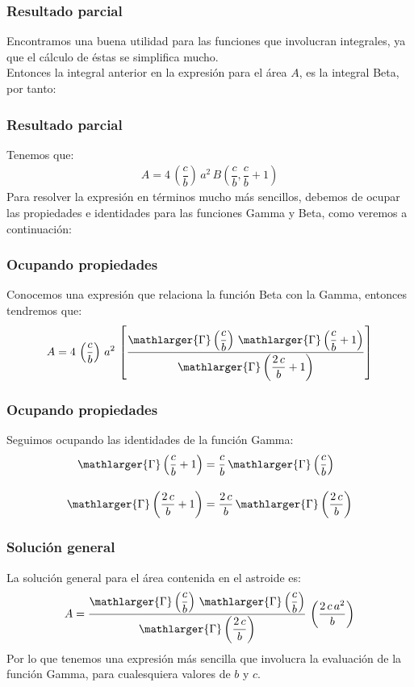 \documentclass[12pt]{beamer}
\begin{document}
\begin{frame}
\frametitle{Resultado parcial}
Encontramos una buena utilidad para las funciones que involucran integrales, ya que el cálculo de éstas se simplifica mucho.
\\
\bigskip
\pause
Entonces la integral anterior en la expresión para el área $A$, es la integral Beta, por tanto:
\end{frame}
\begin{frame}
\frametitle{Resultado parcial}
Tenemos que:
\pause
\begin{align*}
A = 4 \, \left( \dfrac{c}{b} \right) \, a^{2} \, B \left( \dfrac{c}{b}, \dfrac{c}{b} + 1 \right)
\end{align*}
\pause
Para resolver la expresión en términos mucho más sencillos, debemos de ocupar las propiedades e identidades para las funciones Gamma y Beta, como veremos a continuación:
\end{frame}
\begin{frame}
\frametitle{Ocupando propiedades}
Conocemos una expresión que relaciona la función Beta con la Gamma, entonces tendremos que:
\pause 
\begin{align*}
A = 4 \, \left( \dfrac{c}{b} \right) \, a^{2} \, \left[ \dfrac{\mathlarger{\Gamma} \left( \dfrac{c}{b} \right) \, \mathlarger{\Gamma} \left( \dfrac{c}{b} + 1 \right)}{\mathlarger{\Gamma} \left( \dfrac{2 \, c}{b} + 1 \right)} \right]
\end{align*}
\end{frame}
\begin{frame}
\frametitle{Ocupando propiedades}
Seguimos ocupando las identidades de la función Gamma:
\pause 
\begin{align*}
\mathlarger{\Gamma} \left( \dfrac{c}{b} + 1 \right) &= \dfrac{c}{b} \, \mathlarger{\Gamma} \left( \dfrac{c}{b} \right) \\[1em]
\mathlarger{\Gamma} \left( \dfrac{2 \, c}{b} + 1 \right) &= \dfrac{2 \, c}{b} \, \mathlarger{\Gamma} \left( \dfrac{2 \, c}{b} \right)
\end{align*}
\end{frame}
\begin{frame}
\frametitle{Solución general}
La solución general para el área contenida en el astroide es:
\pause
\begin{align*}
A = \dfrac{\mathlarger{\Gamma} \left( \dfrac{c}{b} \right) \, \mathlarger{\Gamma} \left( \dfrac{c}{b} \right)}{\mathlarger{\Gamma} \left( \dfrac{2 \, c}{b} \right)} \, \left( \dfrac{2 \, c \, a^{2}}{b} \right)
\end{align*}
\pause
Por lo que tenemos una expresión más sencilla que involucra la evaluación de la función Gamma, para cualesquiera valores de $b$ y $c$.
\end{frame}
\end{document}
